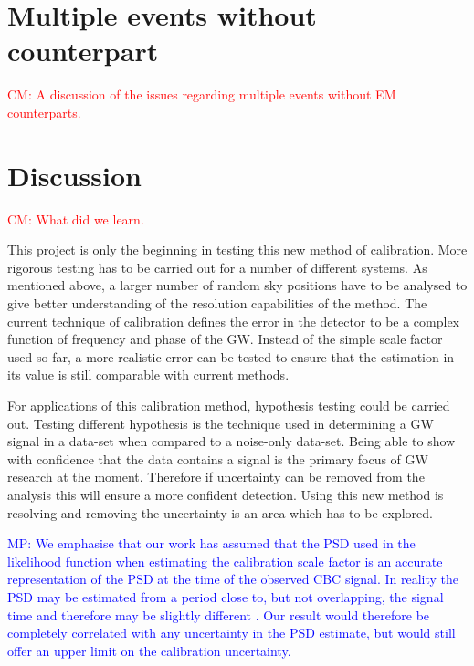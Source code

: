 \documentclass[10pt]{iopart}
\newcommand{\cm}[1]{\textcolor{red}{CM: #1}}
\newcommand{\MP}[1]{\textcolor{blue}{MP: #1}}
\begin{document}
\section{Multiple events without counterpart\label{sec:multiple}}

\cm{A discussion of the issues regarding multiple events
without EM counterparts.}

\section{Discussion\label{sec:discussion}}

\cm{What did we learn.}

This project is only the beginning in testing this new method of calibration.
More rigorous testing has to be carried out for a number of different systems.
As mentioned above, a larger number of random sky positions have to be analysed
to give better understanding of the resolution capabilities of the method. The
current technique of calibration defines the error in the detector to be a
complex function of frequency and phase of the GW. Instead of the simple scale
factor used so far, a more realistic error can be tested to ensure that the
estimation in its value is still comparable with current methods.


For applications of this calibration method, hypothesis testing could be
carried out. Testing different hypothesis is the technique used in determining
a GW signal in a data-set when compared to a noise-only data-set. Being able to
show with confidence that the data contains a signal is the primary focus of GW
research at the moment. Therefore if uncertainty can be removed from the
analysis this will ensure a more confident detection. Using this new method is
resolving and removing the uncertainty is an area which has to be explored.

\MP{We emphasise that our work has assumed that the PSD used in the likelihood function
when estimating the calibration scale factor is an accurate representation of the
PSD at the time of the observed CBC signal. In reality the PSD may be estimated from
a period close to, but not overlapping, the signal time and therefore may be slightly
different \cite{2013PhRvD..88h4044L}. Our result would therefore be completely correlated
with any uncertainty in the PSD estimate, but would still offer an upper limit
on the calibration uncertainty.}
\end{document}
